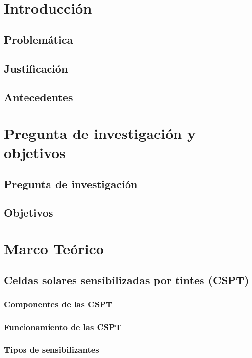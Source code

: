 \documentclass{article}
\theoremstyle{mytheoremstyle}
\theoremstyle{mytheoremstyle}
\theoremstyle{myproblemstyle}
\begin{document}
    \newpage
    \section{Introducción}
    \subsection{Problemática}
    
    \subsection{Justificación}
    
    \subsection{Antecedentes}
    
    \section{Pregunta de investigación y objetivos}
    \subsection{Pregunta de investigación}
    \subsection{Objetivos}
    \section{Marco Teórico}
    \subsection{Celdas solares sensibilizadas por tintes (CSPT)}

    \subsubsection{Componentes de las CSPT}
    \subsubsection{Funcionamiento de las CSPT}
    \subsubsection{Tipos de sensibilizantes}
\end{document}
